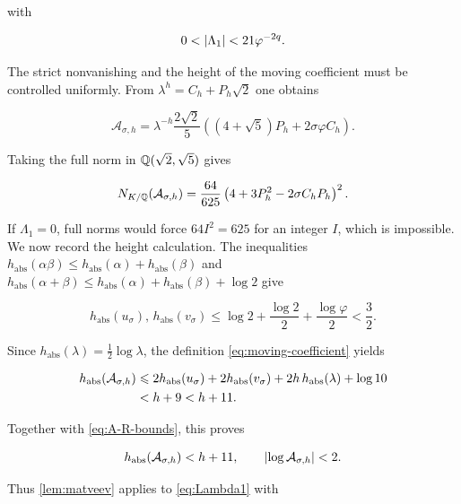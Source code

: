 with

\begin{equation}
 0<\lvert\Lambda_1\rvert<21\varphi^{-2q}.
 \label{eq:Lambda1-small}
\end{equation}

The strict nonvanishing and the height of the moving coefficient must be
controlled uniformly. From
$\lambda^h=C_h+P_h\sqrt2$ one obtains

\begin{equation}
 \mathcal A_{\sigma,h}
 =\lambda^{-h}\frac{2\sqrt2}{5}
 \left((4+\sqrt5)P_h+2\sigma\varphi C_h\right).
 \label{eq:A-pell}
\end{equation}

Taking the full norm in $\mathbb{Q}(\sqrt2,\sqrt5)$ gives

\begin{equation}
 N_{K/\mathbb{Q}}(\mathcal A_{\sigma,h})
 =\frac{64}{625}
 \left(4+3P_h^2-2\sigma C_hP_h\right)^2.
 \label{eq:A-norm}
\end{equation}

If $\Lambda_1=0$, full norms would force $64I^2=625$ for an integer $I$,
which is impossible. We now record the height calculation. The inequalities
$h_{\mathrm{abs}}(\alpha\beta)\leqslant
h_{\mathrm{abs}}(\alpha)+h_{\mathrm{abs}}(\beta)$ and
$h_{\mathrm{abs}}(\alpha+\beta)\leqslant
h_{\mathrm{abs}}(\alpha)+h_{\mathrm{abs}}(\beta)+\log2$ give

\begin{equation}
 h_{\mathrm{abs}}(u_\sigma),\,
 h_{\mathrm{abs}}(v_\sigma)
 \leqslant
 \log2+\frac{\log2}{2}+\frac{\log\varphi}{2}
 <\frac32.
\end{equation}

Since $h_{\mathrm{abs}}(\lambda)=\tfrac12\log\lambda$, the definition
\cref{eq:moving-coefficient} yields

\begin{align}
 h_{\mathrm{abs}}(\mathcal A_{\sigma,h})
 &\leqslant
 2h_{\mathrm{abs}}(u_\sigma)
 +2h_{\mathrm{abs}}(v_\sigma)
 +2h\,h_{\mathrm{abs}}(\lambda)+\log10\notag\\
 &<h+9<h+11.
\end{align}

Together with \cref{eq:A-R-bounds}, this proves

\begin{equation}
 h_{\mathrm{abs}}\!\left(\mathcal A_{\sigma,h}\right)<h+11,
 \qquad
 \lvert\log\mathcal A_{\sigma,h}\rvert<2.
 \label{eq:A-height}
\end{equation}

Thus \cref{lem:matveev} applies to \cref{eq:Lambda1} with

